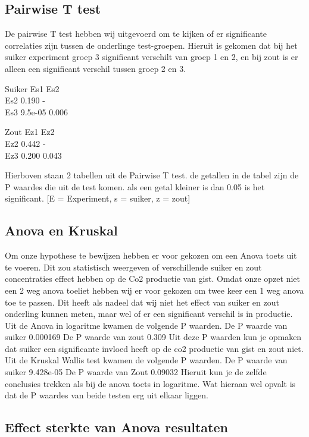 \documentclass[
]{article}
\begin{document}
\subsection{Pairwise T test}\label{pairwise-t-test}

De pairwise T test hebben wij uitgevoerd om te kijken of er significante correlaties zijn tussen de onderlinge test-groepen. Hieruit is gekomen dat bij het suiker experiment groep 3 significant verschilt van groep 1 en 2, en bij zout is er alleen een significant verschil tussen groep 2 en 3.

Suiker
Es1 Es2\\
Es2 0.190 -\\
Es3 9.5e-05 0.006

Zout
Ez1 Ez2\\
Ez2 0.442 -\\
Ez3 0.200 0.043

Hierboven staan 2 tabellen uit de Pairwise T test. de getallen in de tabel zijn de P waardes die uit de test komen. als een getal kleiner is dan 0.05 is het significant.
{[}E = Experiment, s = suiker, z = zout{]}

\subsection{Anova en Kruskal}\label{anova-en-kruskal}

Om onze hypothese te bewijzen hebben er voor gekozen om een Anova toets uit te voeren. Dit zou statistisch weergeven of verschillende suiker en zout concentraties effect hebben op de Co2 productie van gist.
Omdat onze opzet niet een 2 weg anova toeliet hebben wij er voor gekozen om twee keer een 1 weg anova toe te passen. Dit heeft als nadeel dat wij niet het effect van suiker en zout onderling kunnen meten, maar wel of er een significant verschil is in productie.
Uit de Anova in logaritme kwamen de volgende P waarden.
De P waarde van suiker 0.000169
De P waarde van zout 0.309
Uit deze P waarden kun je opmaken dat suiker een significante invloed heeft op de co2 productie van gist en zout niet.
Uit de Kruskal Wallis test kwamen de volgende P waarden.
De P waarde van suiker 9.428e-05
De P waarde van Zout 0.09032
Hieruit kun je de zelfde conclusies trekken als bij de anova toets in logaritme. Wat hieraan wel opvalt is dat de P waardes van beide testen erg uit elkaar liggen.

\subsection{Effect sterkte van Anova resultaten}\label{effect-sterkte-van-anova-resultaten}
\end{document}
